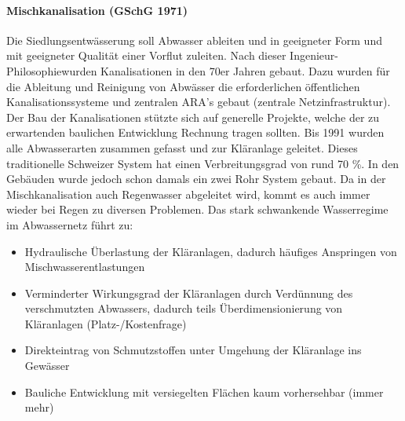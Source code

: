 \documentclass[9pt, openright=false]{scrartcl}
\begin{document}
\paragraph{Mischkanalisation (GSchG 1971)} Die Siedlungsentwässerung soll Abwasser ableiten und in geeigneter Form und mit geeigneter Qualität einer Vorflut zuleiten. Nach dieser \glqq Ingenieur-Philosophie\grqq wurden Kanalisationen in den 70er Jahren gebaut. Dazu wurden für die Ableitung und Reinigung von Abwässer die erforderlichen öffentlichen Kanalisationssysteme und zentralen ARA's gebaut (zentrale Netzinfrastruktur). Der Bau der Kanalisationen stützte sich auf generelle Projekte, welche der zu erwartenden baulichen Entwicklung Rechnung tragen sollten. Bis 1991 wurden alle Abwasserarten zusammen gefasst und zur Kläranlage geleitet. Dieses traditionelle Schweizer System hat einen Verbreitungsgrad von rund 70 \%. In den Gebäuden wurde jedoch schon damals ein zwei Rohr System gebaut. Da in der Mischkanalisation auch Regenwasser abgeleitet wird, kommt es auch immer wieder bei Regen zu diversen Problemen. Das stark schwankende Wasserregime im Abwassernetz führt zu:
\begin{itemize}
\item Hydraulische Überlastung der Kläranlagen, dadurch häufiges Anspringen von Mischwasserentlastungen
\item Verminderter Wirkungsgrad der Kläranlagen durch Verdünnung des verschmutzten Abwassers, dadurch teils Überdimensionierung von Kläranlagen (Platz-/Kostenfrage)
\item Direkteintrag von Schmutzstoffen unter Umgehung der Kläranlage ins Gewässer
\item Bauliche Entwicklung mit versiegelten Flächen kaum vorhersehbar (immer mehr)
\end{itemize}
\end{document}

